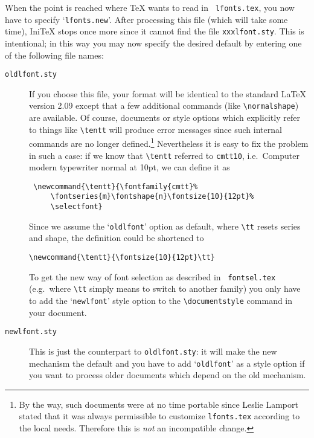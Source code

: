  When the point is reached where \TeX{} wants to read in {\tt
 lfonts.tex}, you now have to specify `{\tt lfonts.new}'.  After
 processing this file (which will take some time), Ini\TeX{} stops
 once more since it cannot find the file {\tt xxxlfont.sty}.  This is
 intentional;  in this way you may now specify the desired
 default by entering one of the following file names:
\begin{description}
 \item[{\tt oldlfont.sty}]
    If you choose this file, your format will be identical to the
     standard \LaTeX{} version 2.09 except that a few additional
     commands (like \verb+\normalshape+) are available.  Of course,
     documents or style options which explicitly refer to things like
     \verb+\tentt+ will produce error messages since such internal
     commands are no longer defined.\footnote{By the way, such
     documents were at no time portable since Leslie Lamport stated
     that it was always permissible to customize {\tt lfonts.tex}
     according to the local needs. Therefore this is {\em not\/} an
     incompatible change.} Nevertheless it is easy to fix the
     problem in such a case: if we know that \verb+\tentt+ referred to
     {\tt cmtt10}, i.e.\ Computer modern typewriter normal at 10pt,
     we can define it as
    \begin{verbatim}
 \newcommand{\tentt}{\fontfamily{cmtt}%
     \fontseries{m}\fontshape{n}\fontsize{10}{12pt}%
     \selectfont}
\end{verbatim}
    Since we assume the `{\tt oldlfont}' option as default, where
     \verb+\tt+ resets series and shape, the definition could be
     shortened to
    \begin{verbatim}
\newcommand{\tentt}{\fontsize{10}{12pt}\tt}
\end{verbatim}
    To get the new way of font selection as described in {\tt
 fontsel.tex} (e.g.\ where \verb+\tt+ simply means to switch to
 another family) you only have to add the `{\tt newlfont}' style
 option to the \verb+\documentstyle+ command in your document.

  \item[\tt newlfont.sty]
    This is just the counterpart to {\tt oldlfont.sty}: it will make
     the new mechanism the default and you have to add `{\tt oldlfont}'
     as a style option if you want to process older documents which
     depend on the old mechanism.


\end{description}
